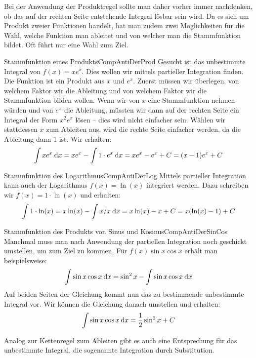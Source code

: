 Bei der Anwendung der Produktregel sollte man daher vorher immer nachdenken, ob das auf der rechten Seite entstehende Integral lösbar sein wird. Da es sich um Produkt zweier Funktionen handelt, hat man zudem zwei Möglichkeiten für die Wahl, welche Funktion man ableitet und von welcher man die Stammfunktion bildet. Oft führt nur eine Wahl zum Ziel.

\begin{example}{Stammfunktion eines Produkts}{CompAntiDerProd}
    Gesucht ist das unbestimmte Integral von $f(x) = x e^x$. Dies wollen wir mittels partieller Integration finden. Die Funktion ist ein Produkt aus $x$ und $e^x$. Zuerst müssen wir überlegen, von welchem Faktor wir die Ableitung und von welchem Faktor wir die Stammfunktion bilden wollen. Wenn wir von $x$ eine Stammfunktion nehmen würden und von $e^x$ die Ableitung, müssten wir dann auf der rechten Seite ein Integral der Form $x^2 e^x$ lösen -- dies wird nicht einfacher sein. Wählen wir stattdessen $x$ zum Ableiten aus, wird die rechte Seite einfacher werden, da die Ableitung dann $1$ ist. Wir erhalten:
    $$
        \int x e^x \:\mathrm{d}{x} = x e^x - \int 1 \cdot e^x \:\mathrm{d}{x} = xe^x-e^x + C = (x-1) e^x + C
    $$
\end{example}

\begin{example}{Stammfunktion des Logarithmus}{CompAntiDerLog}
    Mittels partieller Integration kann auch der Logarithmus $f(x) = \ln(x)$ integriert werden. Dazu schreiben wir $f(x) = 1 \cdot \ln(x)$ und erhalten:
    $$
        \int 1\cdot\ln(x) = x\ln(x) - \int x/x \:\mathrm{d}{x} = x\ln(x)-x+C = x (\ln(x) - 1) + C
    $$
\end{example}

\begin{example}{Stammfunktion des Produkts von Sinus und Kosinus}{CompAntiDerSinCos}
    Manchmal muss man nach Anwendung der partiellen Integration noch geschickt umstellen, um zum Ziel zu kommen. Für $f(x) \sin x\cos x$ erhält man beispielsweise:
    $$
        \int \sin x \cos x \:\mathrm{d}{x} = \sin^2 x - \int \sin x \cos x \:\mathrm{d}{x}
    $$
    Auf beiden Seiten der Gleichung kommt nun das zu bestimmende unbestimmte Integral vor. Wir können die Gleichung danach umstellen und erhalten:
    $$
        \int \sin x \cos x \:\mathrm{d}{x} = \frac{1}{2} \sin^2 x + C
    $$
\end{example}

Analog zur Kettenregel zum Ableiten gibt es auch eine Entsprechung für das unbestimmte Integral, die sogenannte Integration durch Substitution.

